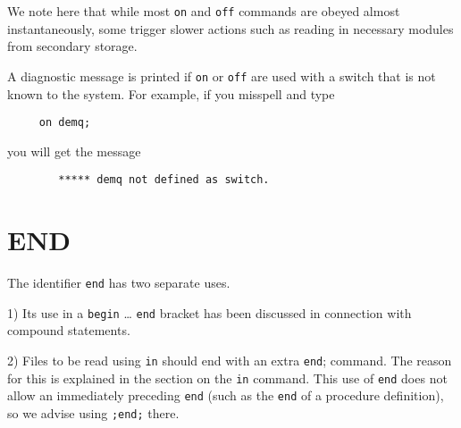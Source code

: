 We note here that while most \texttt{on} and \texttt{off} commands are obeyed
almost instantaneously, some trigger slower actions such as
reading in necessary modules from secondary storage.

A diagnostic message is printed if \texttt{on} or \texttt{off}
 are used with a switch that is not known to the system.  For
example, if you misspell  and type
\begin{verbatim}
     on demq;
\end{verbatim}
you will get the message
\begin{verbatim}
        ***** demq not defined as switch.
\end{verbatim}

\section{END}
\hypertarget{reserved:END}{}

The identifier \texttt{end} has two separate uses.

1) Its use in a \texttt{begin} \ldots{} \texttt{end} bracket has been
discussed in connection with compound statements.

2) Files to be read using \texttt{in} should end with an extra \texttt{end};
command.  The reason for this is explained in the section on the \texttt{in}
command.  This use of \texttt{end} does not allow an immediately
preceding \texttt{end} (such as the \texttt{end} of a procedure definition), so
we advise using \texttt{;end;} there.



